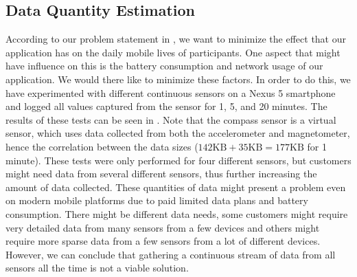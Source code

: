 
\subsection{Data Quantity Estimation}
\label{sec:data_quantity_estimation}


According to our problem statement in , we want to minimize the effect that our application has on the  daily mobile lives of participants. One aspect that might have influence on this is the battery consumption and network usage of our application. We would there like to minimize these factors. In order to do this, we have experimented with different continuous sensors on a Nexus 5 smartphone and logged all values captured from the sensor for 1, 5, and 20 minutes. The results of these tests can be seen in . Note that the compass sensor is a virtual sensor, which uses data collected from both the accelerometer and magnetometer, hence the correlation between the data sizes ($142 \text{KB} + 35 \text{KB} = 177 \text{KB}$ for 1 minute). These tests were only performed for four different sensors, but customers might need data from several different sensors, thus further increasing the amount of data collected. These quantities of data might present a problem even on modern mobile platforms due to paid limited data plans and battery consumption. There might be different data needs, some customers might require very detailed data from many sensors from a few devices and others might require more sparse data from a few sensors from a lot of different devices. However, we can conclude that gathering a continuous stream of data from all sensors all the time is not a viable solution.

